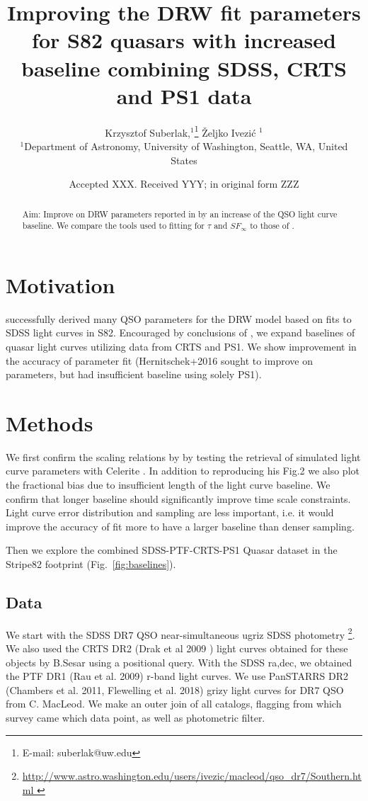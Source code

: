 \documentclass[fleqn,usenatbib]{mnras}  %
\title[DRW baseline]{ Improving the DRW fit parameters for S82 quasars with increased baseline combining SDSS, CRTS and PS1 data}
\author[K. Suberlak et al.]{
Krzysztof Suberlak,$^{1}$\thanks{E-mail: suberlak@uw.edu}
\v{Z}eljko Ivezi\'c $^{1}$
\\
$^{1}$Department of Astronomy, University of Washington, Seattle, WA, United States\\
}
\date{Accepted XXX. Received YYY; in original form ZZZ}
\begin{document}
\label{firstpage}
\pagerange{\pageref{firstpage}--\pageref{lastpage}}
\maketitle

\begin{abstract}
 Aim: Improve on DRW parameters reported in \cite{macleod2011} by an increase of the QSO light curve baseline.  We compare the tools used to fitting for $\tau$ and $SF_{\infty}$ to those of \cite{kozlowski2017a}.
\end{abstract}




\section{Motivation}
\cite{macleod2011} successfully  derived  many QSO parameters for the DRW model based on fits to SDSS light curves in S82. Encouraged by conclusions of \cite{kozlowski2017a},  we expand baselines of quasar light curves  utilizing data from CRTS and PS1. We show improvement in the accuracy of parameter fit (Hernitschek+2016 sought to improve on parameters, but had insufficient baseline using solely PS1). 

\section{Methods}
 We first confirm the scaling relations by \cite{kozlowski2017a} by testing the retrieval of simulated light curve parameters with Celerite . In addition to reproducing his Fig.2  we also plot the fractional bias due to insufficient length of the  light curve baseline. We confirm that longer  baseline should significantly improve time scale constraints. Light curve error distribution and sampling are less important, i.e. it would improve the accuracy of fit more to have a larger baseline than denser sampling. 

Then we explore the combined SDSS-PTF-CRTS-PS1 Quasar dataset in the Stripe82 footprint (Fig.~\ref{fig:baselines}). 

\subsection{Data}
We start with the SDSS DR7 QSO \citep{schneider2007} near-simultaneous ugriz SDSS photometry \footnote{\url{http://www.astro.washington.edu/users/ivezic/macleod/qso_dr7/Southern.html }}. We also used the CRTS DR2 (Drak et al 2009 ) light curves obtained for these objects by  B.Sesar using a positional query. With the SDSS ra,dec, we obtained the PTF DR1 (Rau et al. 2009) r-band light curves. We use PanSTARRS DR2 (Chambers et al. 2011, Flewelling et al. 2018) grizy light curves  for DR7 QSO from C. MacLeod. We make an outer join of all catalogs,  flagging from which survey came which data point, as well as photometric filter. 
\end{document}
